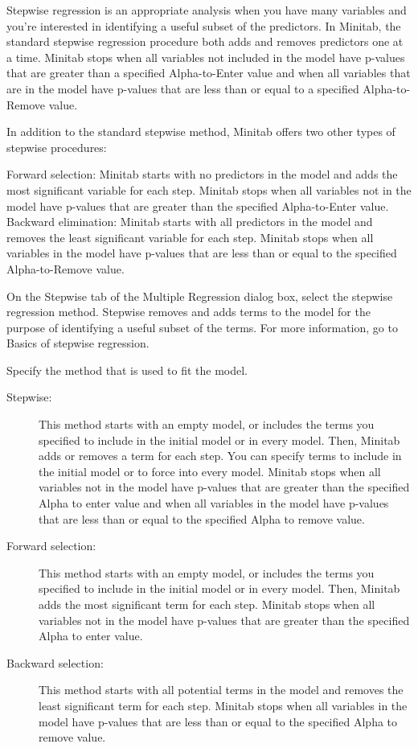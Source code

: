 \documentclass[a4paper,12pt]{article}
\begin{document}
Stepwise regression is an appropriate analysis when you have many variables and you’re interested in identifying a useful subset of the predictors. In Minitab, the standard stepwise regression procedure both adds and removes predictors one at a time. Minitab stops when all variables not included in the model have p-values that are greater than a specified Alpha-to-Enter value and when all variables that are in the model have p-values that are less than or equal to a specified Alpha-to-Remove value.

In addition to the standard stepwise method, Minitab offers two other types of stepwise procedures:

Forward selection:  Minitab starts with no predictors in the model and adds the most significant variable for each step. Minitab stops when all variables not in the model have p-values that are greater than the specified Alpha-to-Enter value.
Backward elimination:  Minitab starts with all predictors in the model and removes the least significant variable for each step. Minitab stops when all variables in the model have p-values that are less than or equal to the specified Alpha-to-Remove value.


On the Stepwise tab of the Multiple Regression dialog box, select the stepwise regression method.
Stepwise removes and adds terms to the model for the purpose of identifying a useful subset of the terms. For more information, go to Basics of stepwise regression.

Specify the method that is used to fit the model.
\begin{description}
	\item[Stepwise:] This method starts with an empty model, or includes the terms you specified to include in the initial model or in every model. Then, Minitab adds or removes a term for each step. You can specify terms to include in the initial model or to force into every model. Minitab stops when all variables not in the model have p-values that are greater than the specified Alpha to enter value and when all variables in the model have p-values that are less than or equal to the specified Alpha to remove value.
	\item[Forward selection:] This method starts with an empty model, or includes the terms you specified to include in the initial model or in every model. Then, Minitab adds the most significant term for each step. Minitab stops when all variables not in the model have p-values that are greater than the specified Alpha to enter value.
	\item[Backward selection:] This method starts with all potential terms in the model and removes the least significant term for each step. Minitab stops when all variables in the model have p-values that are less than or equal to the specified Alpha to remove value.
\end{description}
\end{document}
